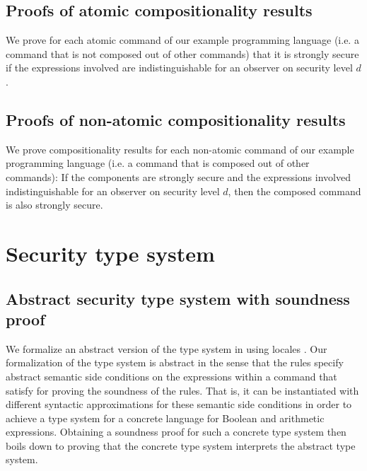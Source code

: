 \documentclass[11pt,a4paper]{article}
\begin{document}


\subsection{Proofs of atomic compositionality results}

We prove for each atomic command of our example programming language
(i.e. a command that is not composed out of other commands) that it is
strongly secure if the expressions involved are indistinguishable for
an observer on security level $d$.



\subsection{Proofs of non-atomic compositionality results}

We prove compositionality results for each non-atomic command of our
example programming language (i.e. a command that is composed out
of other commands): If the components are strongly secure and the
expressions involved indistinguishable for an observer on security
level $d$, then the composed command is also strongly secure.



\section{Security type system}

\subsection{Abstract security type system with soundness proof}

We formalize an abstract version of the type system in
\cite{scheduler-independent} using locales
\cite{conf/types/Ballarin03}. Our formalization of the type system is
abstract in the sense that the rules specify abstract semantic side
conditions on the expressions within a command that satisfy for
proving the soundness of the rules. That is, it can be instantiated
with different syntactic approximations for these semantic side
conditions in order to achieve a type system for a concrete language
for Boolean and arithmetic expressions. Obtaining a soundness proof
for such a concrete type system then boils down to proving that the
concrete type system interprets the abstract type system.
\end{document}
